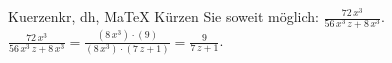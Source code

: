 \begin{MAufgabe}{Kuerzen}{kr, dh, MaTeX}
K\"urzen Sie soweit m\"oglich: $\frac{72\, x^3}{56\, x^3\, z + 8\, x^3}$.\\ 
\ifLsg\MLoesung
\quad $\frac{72\, x^3}{56\, x^3\, z + 8\, x^3}=\frac{(8\, x^3)\cdot(9)}{(8\, x^3)\cdot(7\, z + 1)}=\frac{9}{7\, z + 1}$.\else\relax\fi
 \end{MAufgabe}